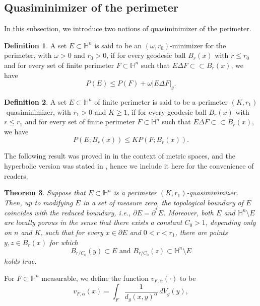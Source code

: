 \documentclass[11pt,reqno]{amsart}
\newtheorem{thm}{Theorem}[section]
\theoremstyle{definition}
\newtheorem{defn}[thm]{Definition}
\theoremstyle{remark}
\numberwithin{equation}{section}
\renewcommand{\(}{\left(}
\renewcommand{\)}{\right)}
\renewcommand{\-}{\overline}
\begin{document}
\subsection{Quasiminimizer of the perimeter} In this subsection, we introduce two notions of quasiminimizer of the perimeter.
\begin{defn}
	A set $E\subset\mathbb{H}^n$ is said to be an $(\omega,r_0)$-minimizer for the perimeter, with $\omega>0$ and $r_0>0$, if for every geodesic ball $B_r(x)$ with $r\leq r_0$ and for every set of finite perimeter $F\subset\mathbb{H}^n$ such that $E\Delta F\subset\subset B_r(x)$, we have 
	\begin{equation}\label{Defn-Quasi}
		P(E)\leq P(F)+\omega |E\Delta F|_g.
	\end{equation}
\end{defn}
\begin{defn}\label{Defn-Quasi11}
	A set $E\subset\mathbb{H}^n$ of finite perimeter is said to be a perimeter $(K,r_1)$-quasiminimizer, with $r_1>0$ and $K\geq 1$, if for every geodesic ball $B_r(x)$ with $r\leq r_1$ and for every set of finite perimeter $F\subset\mathbb{H}^n$ such that $E\Delta F\subset\subset B_r(x)$, we have 
	\begin{equation}\label{Defn-Quasi1}
		P(E;B_r(x))\leq KP(F;B_r(x)).
	\end{equation}
\end{defn}
The following result was proved in \cite[Theorem 5.2]{Kin13} in the context of metric spaces, and the hyperbolic version was stated in \cite[Theorem 5.1]{Bogelein15}, hence we include it here for the convenience of readers.
\begin{thm}\label{Thm-quasim}
	Suppose that $E\subset\mathbb{H}^n$ is a perimeter $(K,r_1)$-quasiminimizer. Then, up to modifying $E$ in a set of measure zero, the topological boundary of $E$ coincides with the reduced boundary, i.e., $\partial E=\partial^* E$. Moreover, both $E$ and $\mathbb{H}^n\setminus E$ are locally porous in the sense that there exists a constant $C_0>1$, depending only on $n$ and $K$, such that for every $x\in\partial E$ and $0<r<r_1$, there are points $y,z\in B_r(x)$ for which
	\begin{equation*}
		B_{r/C_0}(y)\subset E\,\,\text{and}\,\, B_{r/C_0}(z)\subset \mathbb{H}^n\setminus E
	\end{equation*}
	holds true.
\end{thm}
For $F\subset\mathbb{H}^n$ measurable, we define the function $v_{F,\alpha}(\cdot)$ to be 
\begin{equation}\label{Defn-Vf}
	v_{F,\alpha}(x)=\int_F{\frac{1}{d_g(x,y)^{\alpha}}}\,dV_g(y),
\end{equation}
\end{document}
